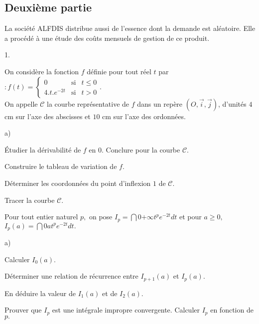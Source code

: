 \documentclass[11pt]{article}%
\begin{document}
\subsection*{Deuxième partie}

La société ALFDIS distribue aussi de l'essence dont la demande est
aléatoire. Elle a procédé à une étude des coûts mensuels de gestion de
ce
produit.

\begin{noliste}{1.}
 \setlength{\itemsep}{4mm}
\item On considère la fonction $f$ définie pour tout réel $t$ par $
:f(t) = \left\{ 
\begin{array}{ccc}
0 & \text{si} & t\leq 0 \\
4.t.e^{-2t} & \text{si} & t>0
\end{array}
\right..$\\
On appelle $\mathcal{C}$ la courbe représentative de $f$ dans un repère
$(O,\overrightarrow{i},\overrightarrow{j})$, d'unités $4$ cm sur l'axe
des
abscisses et $10$ cm sur l'axe des ordonnées.

\begin{noliste}{a)}
 \setlength{\itemsep}{2mm}
\item Étudier la dérivabilité de $f$ en $0.$ Conclure pour la courbe
$\mathcal{C}.$

\item Construire le tableau de variation de $f.$

\item Déterminer les coordonnées du point d'inflexion $1$ de
$\mathcal{C}.$

\item Tracer la courbe $\mathcal{C}.$
\end{noliste}

\item Pour tout entier naturel $p,$ on pose $I_{p} = \dint{0}{+ \infty
}t^{p}e^{-2t}dt$ et pour $a\geq 0,$ $I_{p}(a) =
\dint{0}{a}t^{p}e^{-2t}dt.$

\begin{noliste}{a)}
 \setlength{\itemsep}{2mm}
\item Calculer $I_{0}(a).$

\item Déterminer une relation de récurrence entre $I_{p + 1}(a)$ et
$I_{p}(a).$

\item En déduire la valeur de $I_{1}(a)$ et de $I_{2}(a).$

\item Prouver que $I_{p}$ est une intégrale impropre convergente.
Calculer $I_{p}$ en fonction de $p.$


\end{noliste}
\end{noliste}
\end{document}
